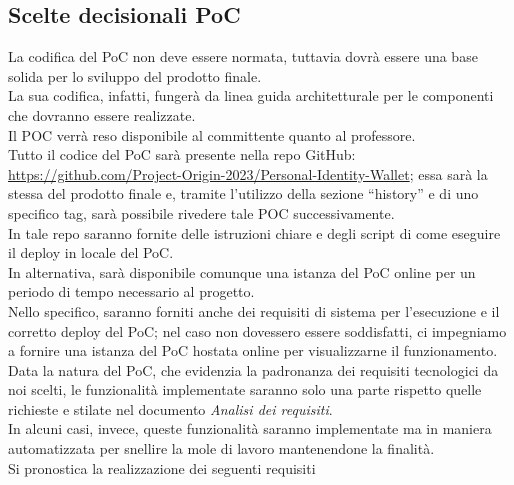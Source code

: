 \subsection{Scelte decisionali PoC}

La codifica del PoC non deve essere normata, tuttavia dovrà essere una base solida per lo sviluppo del prodotto finale.\\
La sua codifica, infatti, fungerà da linea guida architetturale per le componenti che dovranno essere realizzate.\\
Il POC verrà reso disponibile al committente quanto al professore.\\
Tutto il codice del PoC sarà presente nella repo GitHub: \url{https://github.com/Project-Origin-2023/Personal-Identity-Wallet}; essa sarà la stessa del prodotto finale e, tramite l’utilizzo della sezione “history” e di uno specifico tag, sarà possibile rivedere tale POC successivamente.\\
In tale repo saranno fornite delle istruzioni chiare e degli script di come eseguire il deploy in locale del PoC.\\
In alternativa, sarà disponibile comunque una istanza del PoC online per un periodo di tempo necessario al progetto.\\
Nello specifico, saranno forniti anche dei requisiti di sistema per l’esecuzione e il corretto deploy del PoC; nel caso non dovessero essere soddisfatti, ci impegniamo a fornire una istanza del PoC hostata online per visualizzarne il funzionamento.\\
Data la natura del PoC, che evidenzia la padronanza dei requisiti tecnologici da noi scelti, le funzionalità implementate saranno solo una parte rispetto quelle richieste e stilate nel documento \textit{Analisi dei requisiti}.\\
In alcuni casi, invece, queste funzionalità saranno implementate ma in maniera automatizzata per snellire la mole di lavoro mantenendone la finalità. \\
Si pronostica la realizzazione dei seguenti requisiti
